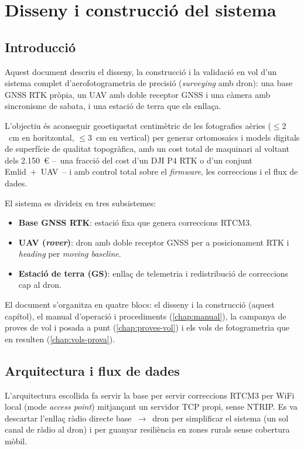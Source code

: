 \chapter{Disseny i construcció del sistema}
\label{chap:construccio}

\section{Introducció}
\label{sec:introduccio}

Aquest document descriu el disseny, la construcció i la validació en vol d'un sistema complet d'aerofotogrametria de precisió (\emph{surveying} amb dron): una base GNSS RTK pròpia, un UAV amb doble receptor GNSS i una càmera amb sincronisme de sabata, i una estació de terra que els enllaça.

L'objectiu és aconseguir geoetiquetat centimètric de les fotografies aèries ($\leq 2$~cm en horitzontal, $\leq 3$~cm en vertical) per generar ortomosaics i models digitals de superfície de qualitat topogràfica, amb un cost total de maquinari al voltant dels 2.150~€ --~una fracció del cost d'un DJI P4 RTK o d'un conjunt Emlid~+~UAV~-- i amb control total sobre el \emph{firmware}, les correccions i el flux de dades.

El sistema es divideix en tres subsistemes:
\begin{itemize}
    \item \textbf{Base GNSS RTK}: estació fixa que genera correccions RTCM3.
    \item \textbf{UAV (\emph{rover})}: dron amb doble receptor GNSS per a posicionament RTK i \emph{heading} per \emph{moving baseline}.
    \item \textbf{Estació de terra (GS)}: enllaç de telemetria i redistribució de correccions cap al dron.
\end{itemize}

El document s'organitza en quatre blocs: el disseny i la construcció (aquest capítol), el manual d'operació i procediments (\cref{chap:manual}), la campanya de proves de vol i posada a punt (\cref{chap:proves-vol}) i els vols de fotogrametria que en resulten (\cref{chap:vols-prova}).

\section{Arquitectura i flux de dades}
\label{sec:arquitectura}

L'arquitectura escollida fa servir la base per servir correccions RTCM3 per WiFi local (mode \emph{access point}) mitjançant un servidor TCP propi, sense NTRIP. Es va descartar l'enllaç ràdio directe base~$\rightarrow$~dron per simplificar el sistema (un sol canal de ràdio al dron) i per guanyar resiliència en zones rurals sense cobertura mòbil.

